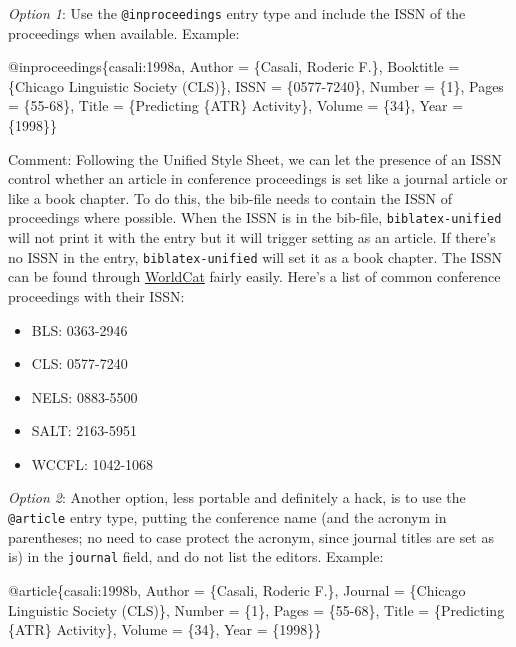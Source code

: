 \documentclass[
]{article}
\newenvironment{Shaded}{\begin{snugshade}}{\end{snugshade}}
\newcommand{\DataTypeTok}[1]{\textcolor[rgb]{0.00,0.34,0.68}{#1}}
\newcommand{\NormalTok}[1]{\textcolor[rgb]{0.12,0.11,0.11}{#1}}
\newcommand{\OtherTok}[1]{\textcolor[rgb]{0.00,0.43,0.16}{#1}}
\newcommand{\VariableTok}[1]{\textcolor[rgb]{0.00,0.34,0.68}{#1}}
\providecommand{\tightlist}{%
  \setlength{\itemsep}{0pt}\setlength{\parskip}{0pt}}
\begin{document}
\emph{Option 1}: Use the \texttt{@inproceedings} entry type and include
the ISSN of the proceedings when available. Example:

\begin{Shaded}
\begin{Highlighting}[]
\VariableTok{@inproceedings}\NormalTok{\{}\OtherTok{casali:1998a}\NormalTok{,}
    \DataTypeTok{Author}\NormalTok{ = \{Casali, Roderic F.\},}
    \DataTypeTok{Booktitle}\NormalTok{ = \{Chicago Linguistic Society (CLS)\},}
    \DataTypeTok{ISSN}\NormalTok{ = \{0577{-}7240\},}
    \DataTypeTok{Number}\NormalTok{ = \{1\},}
    \DataTypeTok{Pages}\NormalTok{ = \{55{-}68\},}
    \DataTypeTok{Title}\NormalTok{ = \{Predicting \{ATR\} Activity\},}
    \DataTypeTok{Volume}\NormalTok{ = \{34\},}
    \DataTypeTok{Year}\NormalTok{ = \{1998\}\}}
\end{Highlighting}
\end{Shaded}

Comment: Following the Unified Style Sheet, we can let the presence of
an ISSN control whether an article in conference proceedings is set like
a journal article or like a book chapter. To do this, the bib-file needs
to contain the ISSN of proceedings where possible. When the ISSN is in
the bib-file, \texttt{biblatex-unified} will not print it with the entry
but it will trigger setting as an article. If there's no ISSN in the
entry, \texttt{biblatex-unified} will set it as a book chapter. The ISSN
can be found through \href{http://www.worldcat.org}{WorldCat} fairly
easily. Here's a list of common conference proceedings with their ISSN:

\begin{itemize}
\tightlist
\item
  BLS: 0363-2946
\item
  CLS: 0577-7240
\item
  NELS: 0883-5500
\item
  SALT: 2163-5951
\item
  WCCFL: 1042-1068
\end{itemize}

\emph{Option 2}: Another option, less portable and definitely a hack, is
to use the \texttt{@article} entry type, putting the conference name
(and the acronym in parentheses; no need to case protect the acronym,
since journal titles are set as is) in the \texttt{journal} field, and
do not list the editors. Example:

\begin{Shaded}
\begin{Highlighting}[]
\VariableTok{@article}\NormalTok{\{}\OtherTok{casali:1998b}\NormalTok{,}
    \DataTypeTok{Author}\NormalTok{ = \{Casali, Roderic F.\},}
    \DataTypeTok{Journal}\NormalTok{ = \{Chicago Linguistic Society (CLS)\},}
    \DataTypeTok{Number}\NormalTok{ = \{1\},}
    \DataTypeTok{Pages}\NormalTok{ = \{55{-}68\},}
    \DataTypeTok{Title}\NormalTok{ = \{Predicting \{ATR\} Activity\},}
    \DataTypeTok{Volume}\NormalTok{ = \{34\},}
    \DataTypeTok{Year}\NormalTok{ = \{1998\}\}}
\end{Highlighting}
\end{Shaded}
\end{document}

